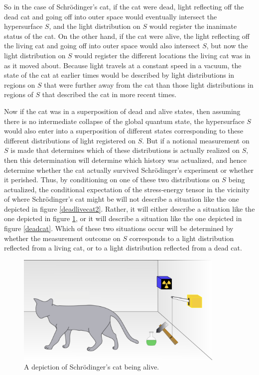 \documentclass[12pt]{report}
\begin{document}
So in the case of Schr\"{o}dinger's cat, if the cat were dead,  light reflecting off the dead cat and going off into outer space would eventually intersect the hypersurface $S$, and the light distribution on $S$ would register the inanimate status of the cat. On the other hand, if the cat were alive, the light reflecting off the living cat and going off into outer space would also intersect $S$, but now the light distribution on $S$ would register the different locations the living cat was in as it moved about. Because light travels at a constant speed in a vacuum, the state of the cat at earlier times would be described by light distributions in regions on $S$ that were further away from the cat than those light distributions in regions of $S$ that described the cat in more recent times. 

Now if the cat was in a superposition of dead and alive states, then assuming there is no intermediate collapse of the global quantum state,  the hypersurface $S$ would also enter into a superposition of different states corresponding to these different distributions of light registered on $S$. But if a notional measurement on $S$ is made that determines which of these distributions is actually realized on $S$, then this determination will determine which history was actualized, and hence determine whether the cat actually survived Schr\"{o}dinger's experiment or whether it perished.   Thus, by conditioning on one of these two distributions on $S$ being actualized, the conditional expectation of the stress-energy tensor in the vicinity of where Schr\"{o}dinger's cat might be 
will not describe a situation like the one depicted in figure \ref{deadlivecat2}.   Rather, it will either describe a situation like the one depicted in figure \ref{livecat}, or it will describe a situation like the one depicted in figure \ref{deadcat}. Which of these two situations occur will be determined by whether the measurement outcome on $S$ corresponds to a light distribution reflected from a living cat, or to a light distribution reflected from a dead cat. 
\begin{figure}[ht!]
  \captionsetup{justification=justified}
  \centering
  \includegraphics[width=100mm]{Chapter03/Schrodingers_livecat.png}
  \caption[Depiction of Schr\"{o}dinger's living cat]{A depiction of Schr\"{o}dinger's cat being alive.\protect\footnotemark}
  \label{livecat}
  \end{figure}
\end{document}
